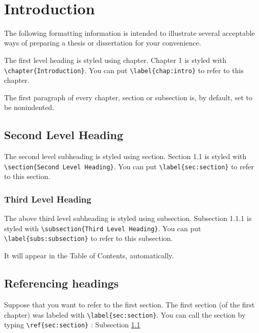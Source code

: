 \documentclass[11pt]{report}
\theoremstyle{plain}
\theoremstyle{definition}
\theoremstyle{corollary}
\theoremstyle{definition}
\theoremstyle{plain}
\theoremstyle{definition}
\theoremstyle{plain}
\begin{document}
\ %

\chapter{Introduction}\label{chap:intro}
The following formatting information is intended to illustrate several acceptable ways of preparing a thesis or dissertation for your convenience.

The first level heading is styled using chapter.
Chapter 1 is styled with\\ \verb|\chapter{Introduction}|.
You can put \verb|\label{chap:intro}| to refer to this chapter.

The first paragraph of every chapter, section or subsection is, by default, set to be nonindented.

\section{Second Level Heading}\label{sec:section}
The second level subheading is styled using section.
Section 1.1 is styled with \verb|\section{Second Level Heading}|.
You can put \verb|\label{sec:section}| to refer to this section.

%
\subsection{Third Level Heading}\label{subs:subsection}
The above third level subheading is styled using subsection.
Subsection 1.1.1 is styled with \verb|\subsection{Third Level Heading}|.
You can put \\\verb|\label{subs:subsection}| to refer to this subsection.

It will appear in the Table of Contents, automatically.

%
\section{Referencing headings}\label{sec:referencing}
Suppose that you want to refer to the first section.
The first section (of the first chapter) was labeled with \verb|\label{sec:section}|.
You can call the section by typing \verb|\ref{sec:section}| : Subsection \ref{sec:section}
\end{document}
